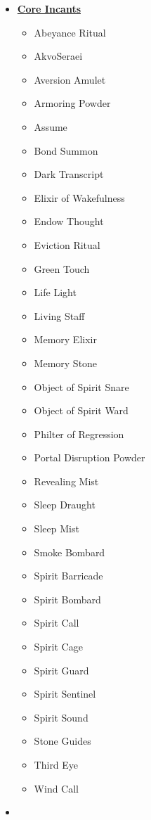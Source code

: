 \setlength{\columnsep}{\defcolwidth}\begin{multicols*}{4}
\renewcommand{\labelenumii}{\arabic{enumii}.}
\begin{itemize}[leftmargin=0pt]
	\item[] \textbf{\ul{Core Incants}}
	\begin{itemize}[leftmargin=0pt]
		\item[] Abeyance Ritual
		\item[] AkvoSeraei
		\item[] Aversion Amulet
		\item[] Armoring Powder
		\item[] Assume
		\item[] Bond Summon
		\item[] Dark Transcript
		\item[] Elixir of Wakefulness
		\item[] Endow Thought
		\item[] Eviction Ritual
		\item[] Green Touch
		\item[] Life Light
		\item[] Living Staff
		\item[] Memory Elixir
		\item[] Memory Stone
		\item[] Object of Spirit Snare
		\item[] Object of Spirit Ward
		\item[] Philter of Regression
		\item[] Portal Disruption Powder
		\item[] Revealing Mist
		\item[] Sleep Draught
		\item[] Sleep Mist
		\item[] Smoke Bombard
		\item[] Spirit Barricade
		\item[] Spirit Bombard
		\item[] Spirit Call
		\item[] Spirit Cage
		\item[] Spirit Guard
		\item[] Spirit Sentinel
		\item[] Spirit Sound
		\item[] Stone Guides
		\item[] Third Eye
		\item[] Wind Call
	\end{itemize}
	\item[] 

\end{itemize}
\end{multicols*}
